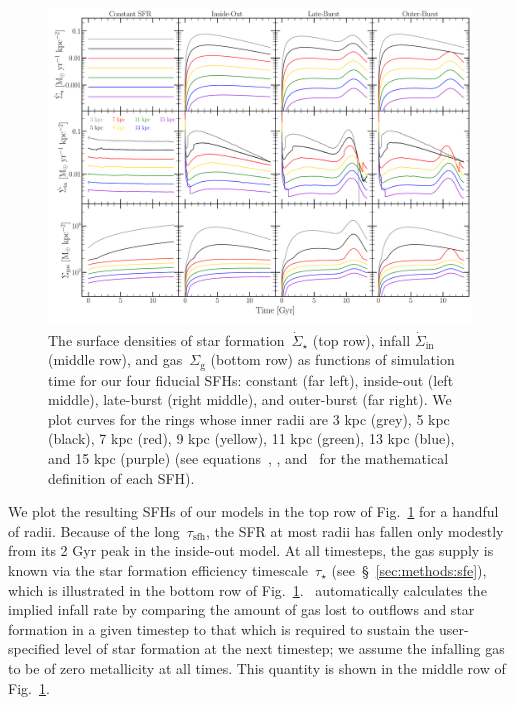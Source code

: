 \documentclass[draft2.tex]{subfiles}
\begin{document}
\begin{figure} 
\centering 
\includegraphics[scale = 0.32]{evol.pdf} 
\caption{The surface densities of star formation~$\dot{\Sigma}_\star$ (top 
row), infall $\dot{\Sigma}_\text{in}$ (middle row), and gas~$\Sigma_\text{g}$ 
(bottom row) as functions of simulation time for our four fiducial SFHs: 
constant (far left), inside-out (left middle), late-burst (right middle), and 
outer-burst (far right). We plot curves for the rings whose inner radii are 
3 kpc (grey), 5 kpc (black), 7 kpc (red), 9 kpc (yellow), 11 kpc (green), 13 
kpc (blue), and 15 kpc (purple) (see equations~, 
, and~ for the mathematical 
definition of each SFH). 
}
\label{fig:evol} 
\end{figure} 

We plot the resulting SFHs of our models in the top row of Fig.~\ref{fig:evol} 
for a handful of radii. 
Because of the long~$\tau_\text{sfh}$, the SFR at most radii has fallen only 
modestly from its 2 Gyr peak in the inside-out model. 
At all timesteps, the gas supply is known via the star formation efficiency 
timescale~$\tau_\star$ (see~\S~\ref{sec:methods:sfe}), which is illustrated in 
the bottom row of Fig.~\ref{fig:evol}. 
\vice~automatically calculates the implied infall rate by comparing the amount 
of gas lost to outflows and star formation in a given timestep to that which is 
required to sustain the user-specified level of star formation at the next 
timestep; we assume the infalling gas to be of zero metallicity at all times. 
This quantity is shown in the middle row of Fig.~\ref{fig:evol}. 
\end{document}
